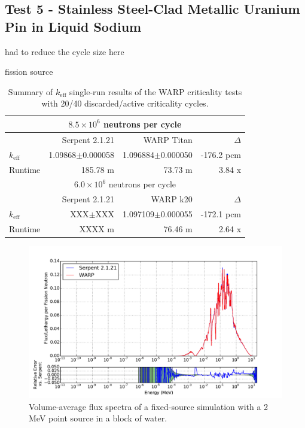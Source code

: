 \documentclass[preprint,12pt]{elsarticle}
\begin{document}
\subsection{Test 5 - Stainless Steel-Clad Metallic Uranium Pin in Liquid Sodium}

had to reduce the cycle size here


fission source

\begin{table}[h]
\centering
\caption{Summary of $k_\mathrm{eff}$ single-run results of the WARP criticality tests with 20/40 discarded/active criticality cycles.}
\label{sodiumpin_table}
\small
\begin{tabular}{| l | r | r | r |}
\hline
\multicolumn{4}{|c|}{$8.5\times10^6$ neutrons per cycle} \\
\hline
                  & Serpent 2.1.21       & WARP Titan              & $\Delta$ \\
\hline
$k_\mathrm{eff}$  & 1.09868$\pm$0.000058 & 1.096884$\pm$0.000050        & -176.2 pcm \\
\hline
Runtime           & 185.78 m             & 73.73 m                 & 3.84 x \\
\hline
\hline
\multicolumn{4}{|c|}{$6.0\times10^6$ neutrons per cycle} \\
\hline
                  & Serpent 2.1.21       & WARP k20            & $\Delta$ \\
\hline
$k_\mathrm{eff}$  & XXX$\pm$XXX & 1.097109$\pm$0.000055    & -172.1 pcm \\
\hline
Runtime           & XXXX m             & 76.46 m             & 2.64 x\\
\hline
\end{tabular}
\end{table}

\begin{figure}[h!]
\centering
\includegraphics[width=\textwidth,trim= 1cm 0cm 1cm 0cm]{graphics/sodiumpin_spec.pdf}
\caption{Volume-average flux spectra of a fixed-source simulation with a 2 MeV point source in a block of water. \label{sodiumpin_spec} }
\end{figure}
\end{document}
